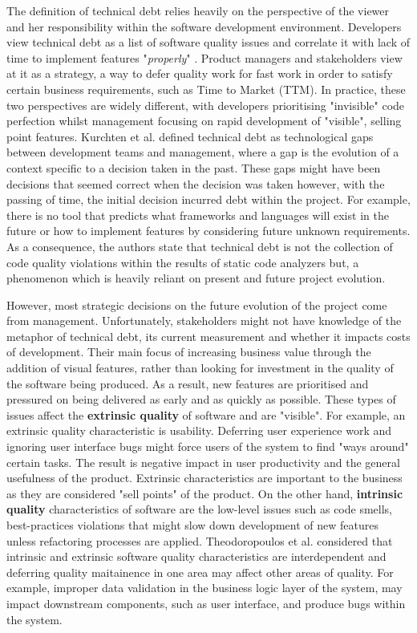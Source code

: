 \documentclass{mprop}
\begin{document}
The definition of technical debt relies heavily on the perspective of the viewer
and her responsibility within the software development environment. Developers view
technical debt as a list of software quality issues and correlate it with lack
of time to implement features "\textit{properly}" \cite{Codabux2013}. Product
managers and stakeholders view at it as a strategy, a way to defer quality work
for fast work in order to satisfy certain business requirements, such as Time to
Market (TTM). In practice, these two perspectives are widely different, with
developers prioritising "invisible" code perfection whilst management focusing
on rapid development of "visible", selling point features. Kurchten et al.
\cite{Kruchten2012} defined technical debt as technological gaps between
development teams and management, where a gap is the evolution of a context
specific to a decision taken in the past. These gaps might have been decisions
that seemed correct when the decision was taken however, with the passing of
time, the initial decision incurred debt within the project. For example, there
is no tool that predicts what frameworks and languages will exist in the future
or how to implement features by considering future unknown requirements. As a
consequence, the authors state that technical debt is not the collection of code
quality violations within the results of static code analyzers but, a phenomenon
which is heavily reliant on present and future project evolution.


However, most strategic decisions on the future evolution of the project come
from management. Unfortunately, stakeholders might not have knowledge of the
metaphor of technical debt, its current measurement and whether it impacts costs
of development. Their main focus of increasing business value through the
addition of visual features, rather than looking for investment in the quality
of the software being produced. As a result, new features are prioritised and
pressured on being delivered as early and as quickly as possible. These types of
issues affect the \textbf{extrinsic quality} of software and are "visible". For
example, an extrinsic quality characteristic is usability. Deferring user
experience work and ignoring user interface bugs might force users of the system
to find "ways around" certain tasks. The result is negative impact in user
productivity and the general usefulness of the product. Extrinsic
characteristics are important to the business as they are considered "sell
points" of the product. On the other hand, \textbf{intrinsic quality}
characteristics of software are the low-level issues such as code smells,
best-practices violations that might slow down development of new features
unless refactoring processes are applied. Theodoropoulos et al.
\cite{Theodoropoulos2011} considered that intrinsic and extrinsic software
quality characteristics are interdependent and deferring quality maitainence in
one area may affect other areas of quality. For example, improper data
validation in the business logic layer of the system, may impact downstream
components, such as user interface, and produce bugs within the system.
\end{document}
